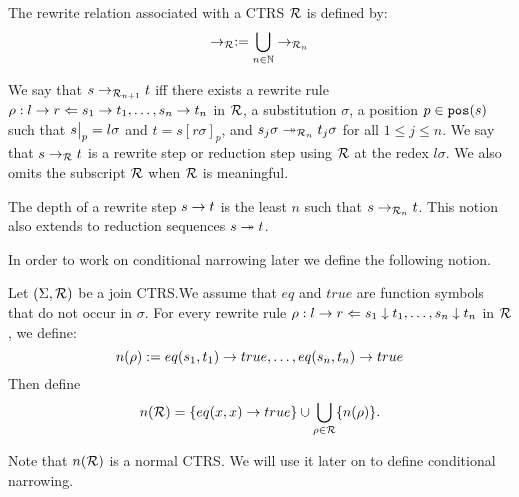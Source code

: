 The rewrite relation associated with a CTRS $\mathcal{R}$ is defined by:
\begin{displaymath}
    \rightarrow_{\mathcal{R}} :=  \bigcup\limits_{n \in \mathbb{N}} \rightarrow_{\mathcal{R}_n}
\end{displaymath}

We say that $s \rightarrow_{\mathcal{R}_{n+1}} t$ iff there exists a rewrite rule $\rho : l \rightarrow r \Leftarrow s_1 \rightarrow t_1, \dots, s_n \rightarrow t_n$ in $\mathcal{R}$, a substitution $\sigma$, a position $p \in \mathtt{pos}(s)$ such that $\restr{s}{p} = l \sigma$ and $t = s[r\sigma]_p$, and $s_j \sigma \twoheadrightarrow_{\mathcal{R}_n} t_j \sigma$ for all $1 \leq j \leq n$. We say that $s \rightarrow_{\mathcal{R}} t$ is a rewrite step or reduction step using $\mathcal{R}$ at the redex $l\sigma$. We also omits the subscript $\mathcal{R}$ when $\mathcal{R}$ is meaningful.

The depth of a rewrite step $s \rightarrow t$ is the least $n$ such that $s \rightarrow_{\mathcal{R}_n} t$. This notion also extends to reduction sequences $s \twoheadrightarrow t$.

In order to work on conditional narrowing later we define the following notion.
\begin{definition}\label{definition:ctrs-approximation-rewrite-relation}
    Let $(\Sigma, \mathcal{R})$ be a join CTRS.We assume that $eq$ and $true$ are function symbols that do not occur in $\sigma$. For every rewrite rule $\rho: l \rightarrow r \Leftarrow s_1 \downarrow t_1, \dots, s_n \downarrow t_n$ in $\mathcal{R}$, we define:
    $$n(\rho) := eq(s_1, t_1) \rightarrow true, \dots, eq(s_n, t_n) \rightarrow true$$
    Then define $$n(\mathcal{R}) = \{ eq(x,x) \rightarrow true \} \cup \bigcup\limits_{\rho \in \mathcal{R}} \{ n(\rho) \}.$$
\end{definition}
Note that $n(\mathcal{R})$ is a normal CTRS. We will use it later on to define conditional narrowing.

